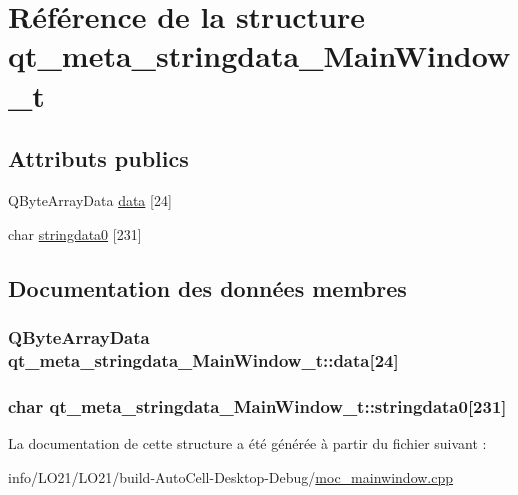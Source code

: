 \hypertarget{structqt__meta__stringdata___main_window__t}{}\section{Référence de la structure qt\+\_\+meta\+\_\+stringdata\+\_\+\+Main\+Window\+\_\+t}
\label{structqt__meta__stringdata___main_window__t}
\subsection*{Attributs publics}
\begin{DoxyCompactItemize}
\item 
Q\+Byte\+Array\+Data \hyperlink{structqt__meta__stringdata___main_window__t_afe3efb55c44aeb65b1905fbb8b35699b}{data} \mbox{[}24\mbox{]}
\item 
char \hyperlink{structqt__meta__stringdata___main_window__t_afb742f40c613588b4a6b55edda5c09e1}{stringdata0} \mbox{[}231\mbox{]}
\end{DoxyCompactItemize}


\subsection{Documentation des données membres}
\subsubsection[{\texorpdfstring{data}{data}}]{\setlength{\rightskip}{0pt plus 5cm}Q\+Byte\+Array\+Data qt\+\_\+meta\+\_\+stringdata\+\_\+\+Main\+Window\+\_\+t\+::data\mbox{[}24\mbox{]}}\hypertarget{structqt__meta__stringdata___main_window__t_afe3efb55c44aeb65b1905fbb8b35699b}{}\label{structqt__meta__stringdata___main_window__t_afe3efb55c44aeb65b1905fbb8b35699b}
\subsubsection[{\texorpdfstring{stringdata0}{stringdata0}}]{\setlength{\rightskip}{0pt plus 5cm}char qt\+\_\+meta\+\_\+stringdata\+\_\+\+Main\+Window\+\_\+t\+::stringdata0\mbox{[}231\mbox{]}}\hypertarget{structqt__meta__stringdata___main_window__t_afb742f40c613588b4a6b55edda5c09e1}{}\label{structqt__meta__stringdata___main_window__t_afb742f40c613588b4a6b55edda5c09e1}


La documentation de cette structure a été générée à partir du fichier suivant \+:\begin{DoxyCompactItemize}
\item 
info/\+L\+O21/\+L\+O21/build-\/\+Auto\+Cell-\/\+Desktop-\/\+Debug/\hyperlink{moc__mainwindow_8cpp}{moc\+\_\+mainwindow.\+cpp}\end{DoxyCompactItemize}
